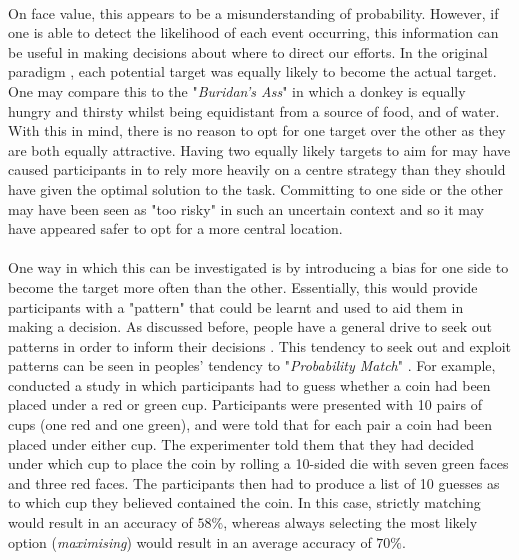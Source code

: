 \documentclass[12pt]{article}
\begin{document}
\paragraph{} On face value, this appears to be a misunderstanding of probability. However, if one is able to detect the likelihood of each event occurring, this information can be useful in making decisions about where to direct our efforts. In the original paradigm \citep{clarke2015failure}, each potential target was equally likely to become the actual target. One may compare this to the "\textit{Buridan's Ass}" in which a donkey is equally hungry and thirsty whilst being equidistant from a source of food, and of water. With this in mind, there is no reason to opt for one target over the other as they are both equally attractive. Having two equally likely targets to aim for may have caused participants in \cite{clarke2015failure} to rely more heavily on a centre strategy than they should have given the optimal solution to the task. Committing to one side or the other may have been seen as "too risky" in such an uncertain context and so it may have appeared safer to opt for a more central location. 

\paragraph{} One way in which this can be investigated is by introducing a bias for one side to become the target more often than the other. Essentially, this would provide participants with a "pattern" that could be learnt and used to aid them in making a decision. As discussed before, people have a general drive to seek out patterns in order to inform their decisions \citep{yellott1969probability}. This tendency to seek out and exploit patterns can be seen in peoples' tendency to "\textit{Probability Match}" \citep{Koehler2010}. For example, \cite{Koehler2010} conducted a study in which participants had to guess whether a coin had been placed under a red or green cup. Participants were presented with 10 pairs of cups (one red and one green), and were told that for each pair a coin had been placed under either cup. The experimenter told them that they had decided under which cup to place the coin by rolling a 10-sided die with seven green faces and three red faces. The participants then had to produce a list of 10 guesses as to which cup they believed contained the coin. In this case, strictly matching would result in an accuracy of $58\%$, whereas always selecting the most likely option (\textit{maximising}) would result in an average accuracy of $70\%$.  
\end{document}
